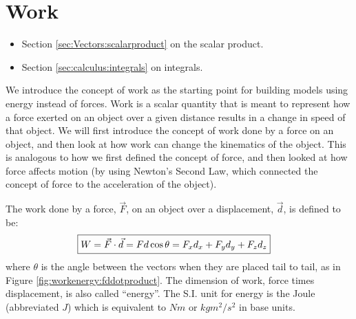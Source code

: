 \section{Work}
\begin{review}
\begin{itemize}
\item Section \ref{sec:Vectors:scalarproduct} on the scalar product.
\item Section \ref{sec:calculus:integrals} on integrals.
\end{itemize}
\end{review}
We introduce the concept of work as the starting point for building models using energy instead of forces. Work is a scalar quantity that is meant to represent how a force exerted on an object over a given distance results in a change in speed of that object. We will first introduce the concept of work done by a force on an object, and then look at how work can change the kinematics of the object. This is analogous to how we first defined the concept of force, and then looked at how force affects motion (by using Newton's Second Law, which connected the concept of force to the acceleration of the object).

The work done by a force, $\vec F$, on an object over a displacement, $\vec d$, is defined to be:
\begin{align}
\Aboxed{W = \vec F \cdot \vec d = Fd\cos\theta = F_xd_x+F_yd_y+F_zd_z}
\end{align}
where $\theta$ is the angle between the vectors when they are placed tail to tail, as in Figure \ref{fig:workenergy:fddotproduct}. The dimension of work, force times displacement, is also called ``energy''. The S.I. unit for energy is the Joule (abbreviated $\si{J}$) which is equivalent to $\si{Nm}$ or $\si{kg m^2/s^2}$ in base units.

